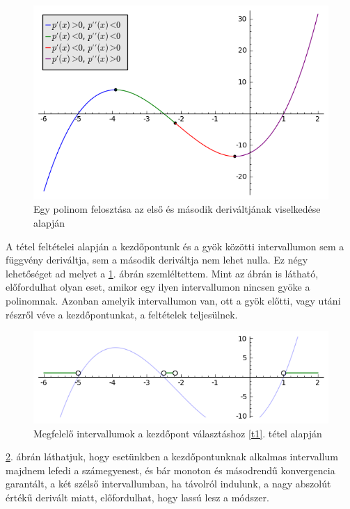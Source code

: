 \documentclass[a4paper,12pt]{report}
\begin{document}
			\begin{figure}[ht]
				\centering
				\includegraphics[scale=0.6]{kep2.png}
				\caption{Egy polinom felosztása az első és második deriváltjának viselkedése alapján}\label{k2}
			\end{figure}
			
			A tétel feltételei alapján a kezdőpontunk és a gyök közötti intervallumon sem a függvény deriváltja, sem a második deriváltja nem lehet nulla. Ez négy lehetőséget ad melyet a \ref{k2}. ábrán szemléltettem. Mint az ábrán is látható, előfordulhat olyan eset, amikor egy ilyen intervallumon nincsen gyöke a polinomnak. Azonban amelyik intervallumon van, ott a gyök előtti, vagy utáni részről véve a kezdőpontunkat, a feltételek teljesülnek.
			
			\begin{figure}[ht]
				\centering
				\includegraphics[scale=0.6]{kep3.png}
				\caption{Megfelelő intervallumok a kezdőpont választáshoz \ref{t1}. tétel alapján}\label{k3}
			\end{figure}
			
			\ref{k3}. ábrán láthatjuk, hogy esetünkben a kezdőpontunknak alkalmas intervallum majdnem lefedi a számegyenest, és bár monoton és másodrendű konvergencia garantált, a két szélső intervallumban, ha távolról indulunk, a nagy abszolút értékű derivált miatt, előfordulhat, hogy lassú lesz a módszer.
\end{document}

